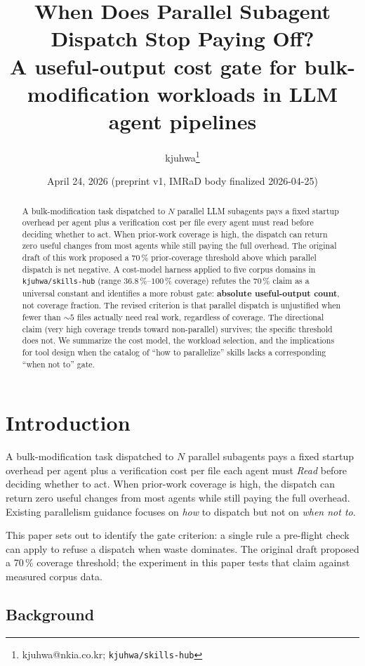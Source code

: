 \documentclass[10pt,letterpaper]{article}
\title{When Does Parallel Subagent Dispatch Stop Paying Off?\\
\large A useful-output cost gate for bulk-modification workloads in LLM agent pipelines}
\author{kjuhwa\thanks{kjuhwa@nkia.co.kr; \texttt{kjuhwa/skills-hub}}}
\date{April 24, 2026 \quad (preprint v1, IMRaD body finalized 2026-04-25)}
\begin{document}
\maketitle

\begin{abstract}
A bulk-modification task dispatched to $N$ parallel LLM subagents pays a fixed
startup overhead per agent plus a verification cost per file every agent must
read before deciding whether to act. When prior-work coverage is high, the
dispatch can return zero useful changes from most agents while still paying
the full overhead. The original draft of this work proposed a 70\,\%
prior-coverage threshold above which parallel dispatch is net negative.
A cost-model harness applied to five corpus domains in
\texttt{kjuhwa/skills-hub} (range $36.8\,\%$--$100\,\%$ coverage) refutes
the 70\,\% claim as a universal constant and identifies a more robust gate:
\textbf{absolute useful-output count}, not coverage fraction. The revised
criterion is that parallel dispatch is unjustified when fewer than
$\sim 5$ files actually need real work, regardless of coverage. The
directional claim (very high coverage trends toward non-parallel) survives;
the specific threshold does not. We summarize the cost model, the workload
selection, and the implications for tool design when the catalog of
``how to parallelize'' skills lacks a corresponding ``when not to'' gate.
\end{abstract}

\section{Introduction}

A bulk-modification task dispatched to $N$ parallel subagents pays a fixed
startup overhead per agent plus a verification cost per file each agent must
\emph{Read} before deciding whether to act. When prior-work coverage is high,
the dispatch can return zero useful changes from most agents while still
paying the full overhead. Existing parallelism guidance focuses on
\emph{how} to dispatch but not on \emph{when not to}.

This paper sets out to identify the gate criterion: a single rule a
pre-flight check can apply to refuse a dispatch when waste dominates. The
original draft proposed a 70\,\% coverage threshold; the experiment in this
paper tests that claim against measured corpus data.

\subsection{Background}
\end{document}
